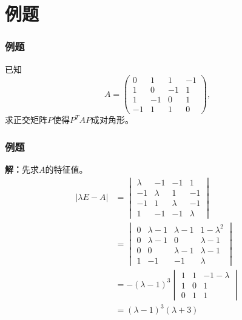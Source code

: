 
\section{例题}


\begin{frame}
\frametitle{例题}

\begin{eg}
已知
\[A = \begin{pmatrix} 0 & 1 & 1 & -1 \\ 1 & 0 & -1 & 1 \\ 1 & -1 & 0 & 1 \\ -1 & 1 & 1 & 0 \end{pmatrix},\]
求正交矩阵$P$使得$P^TAP$成对角形。
\end{eg}

\end{frame}


\begin{frame}
\frametitle{例题}

{\bfseries 解：}先求$A$的特征值。
\begin{align*}
    \lvert \lambda E - A \rvert & = \begin{vmatrix} \lambda & -1 & -1 & 1 \\ -1 & \lambda & 1 & -1 \\ -1 & 1 & \lambda & -1 \\ 1 & -1 & -1 & \lambda \end{vmatrix} \\
    & = \begin{vmatrix} 0 & \lambda-1 & \lambda-1 & 1-\lambda^2 \\ 0 & \lambda-1 & 0 & \lambda-1 \\ 0 & 0 & \lambda-1 & \lambda-1 \\ 1 & -1 & -1 & \lambda \end{vmatrix} \\
    & = - (\lambda - 1)^3 \begin{vmatrix} 1 & 1 & -1-\lambda \\ 1 & 0 & 1 \\ 0 & 1 & 1 \end{vmatrix} \\
    & = (\lambda - 1)^3 (\lambda + 3)
\end{align*}

\end{frame}

